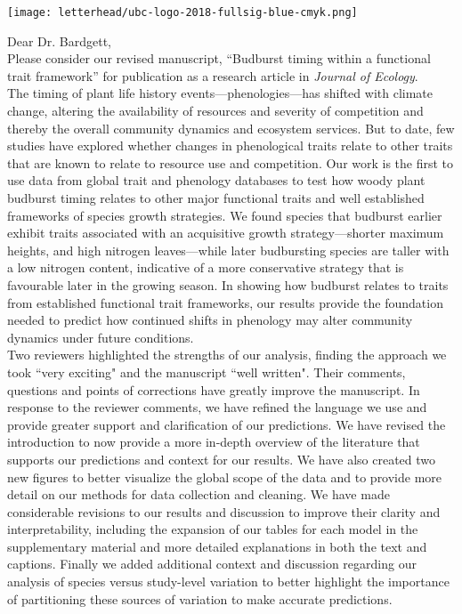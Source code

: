\documentclass[11pt,a4paper]{article}
\begin{document}
\noindent \texttt{[image: letterhead/ubc-logo-2018-fullsig-blue-cmyk.png]}

\noindent Dear Dr. Bardgett,
\vspace{1.5ex}\\
\noindent Please consider our revised manuscript, ``Budburst timing within a functional trait framework'' for publication as a research article in \emph{Journal of Ecology}. 
\vspace{1.5ex}\\ 
\noindent The timing of plant life history events---phenologies---has shifted with climate change, altering the availability of resources and severity of competition and thereby the overall community dynamics and ecosystem services. But to date, few studies have explored whether changes in phenological traits relate to other traits that are known to relate to resource use and competition. Our work is the first to use data from global trait and phenology databases to test how woody plant budburst timing relates to other major functional traits and well established frameworks of species growth strategies. We found species that budburst earlier exhibit traits associated with an acquisitive growth strategy---shorter maximum heights, and high nitrogen leaves---while later budbursting species are taller with a low nitrogen content, indicative of a more conservative strategy that is favourable later in the growing season. In showing how budburst relates to traits from established functional trait frameworks, our results provide the foundation needed to predict how continued shifts in phenology may alter community dynamics under future conditions. 
\vspace{1.5ex}\\ 
Two reviewers highlighted the strengths of our analysis, finding the approach we took ``very exciting" and the manuscript ``well written". Their comments, questions and points of corrections have greatly improve the manuscript. In response to the reviewer comments, we have refined the language we use and provide greater support and clarification of our predictions. We have revised the introduction to now provide a more in-depth overview of the literature that supports our predictions and context for our results. We have also created two new figures to better visualize the global scope of the data and to provide more detail on our methods for data collection and cleaning. We have made considerable revisions to our results and discussion to improve their clarity and interpretability, including the expansion of our tables for each model in the supplementary material and more detailed explanations in both the text and captions. Finally we added additional context and discussion regarding our analysis of species versus study-level variation to better highlight the importance of partitioning these sources of variation to make accurate predictions.
\end{document}
